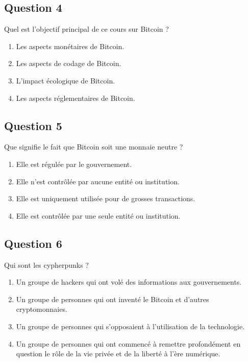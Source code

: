 \documentclass[12pt,a4paper]{article}
\begin{document}
\bigskip


\subsection*{Question 4}
Quel est l'objectif principal de ce cours sur Bitcoin ?

\begin{enumerate}[label=\Alph*., leftmargin=*]
\item Les aspects monétaires de Bitcoin.
\item Les aspects de codage de Bitcoin.
\item L'impact écologique de Bitcoin.
\item Les aspects réglementaires de Bitcoin.
\end{enumerate}

\bigskip


\subsection*{Question 5}
Que signifie le fait que Bitcoin soit une monnaie neutre ?

\begin{enumerate}[label=\Alph*., leftmargin=*]
\item Elle est régulée par le gouvernement.
\item Elle n'est contrôlée par aucune entité ou institution.
\item Elle est uniquement utilisée pour de grosses transactions.
\item Elle est contrôlée par une seule entité ou institution.
\end{enumerate}

\bigskip


\subsection*{Question 6}
Qui sont les cypherpunks ?

\begin{enumerate}[label=\Alph*., leftmargin=*]
\item Un groupe de hackers qui ont volé des informations aux gouvernements.
\item Un groupe de personnes qui ont inventé le Bitcoin et d'autres cryptomonnaies.
\item Un groupe de personnes qui s'opposaient à l'utilisation de la technologie.
\item Un groupe de personnes qui ont commencé à remettre profondément en question le rôle de la vie privée et de la liberté à l'ère numérique.
\end{enumerate}
\end{document}
